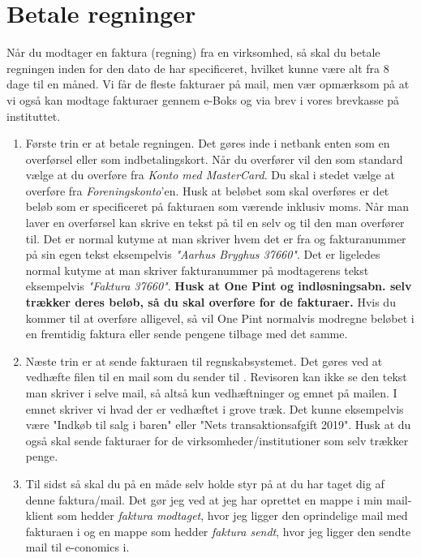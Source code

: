 \section{Betale regninger}
Når du modtager en faktura (regning) fra en virksomhed, så skal du betale regningen inden for den dato de har specificeret, hvilket kunne være alt fra 8 dage til en måned. Vi får de fleste fakturaer på mail, men vær opmærksom på at vi også kan modtage fakturaer gennem e-Boks og via brev i vores brevkasse på instituttet. 
\begin{enumerate}
    \item Første trin er at betale regningen. Det gøres inde i netbank enten som en overførsel eller som indbetalingskort. Når du overfører vil den som standard vælge at du overføre fra \textit{Konto med MasterCard}. Du skal i stedet vælge at overføre fra \textit{Foreningskonto}'en. Husk at beløbet som skal overføres er det beløb som er specificeret på fakturaen som værende inklusiv moms. Når man laver en overførsel kan skrive en tekst på til en selv og til den man overfører til. Det er normal kutyme at man skriver hvem det er fra og fakturanummer på sin egen tekst eksempelvis \textit{"Aarhus Bryghus 37660"}. Det er ligeledes normal kutyme at man skriver fakturanummer på modtagerens tekst eksempelvis \textit{"Faktura 37660"}. \textbf{Husk at One Pint og indløsningsabn. selv trækker deres beløb, så du skal overføre for de fakturaer.} Hvis du kommer til at overføre alligevel, så vil One Pint normalvis modregne beløbet i en fremtidig faktura eller sende pengene tilbage med det samme.
    \item Næste trin er at sende fakturaen til regnskabsystemet. Det gøres ved at vedhæfte filen til en mail som du sender til . Revisoren kan ikke se den tekst man skriver i selve mail, så altså kun vedhæftninger og emnet på mailen. I emnet skriver vi hvad der er vedhæftet i grove træk. Det kunne eksempelvis være "Indkøb til salg i baren" eller "Nets transaktionsafgift 2019". Husk at du også skal sende fakturaer for de virksomheder/institutioner som selv trækker penge.
    \item Til sidst så skal du på en måde selv holde styr på at du har taget dig af denne faktura/mail. Det gør jeg ved at jeg har oprettet en mappe i min mail-klient som hedder \textit{faktura modtaget}, hvor jeg ligger den oprindelige mail med fakturaen i og en mappe som hedder \textit{faktura sendt}, hvor jeg ligger den sendte mail til e-conomics i.
\end{enumerate}

